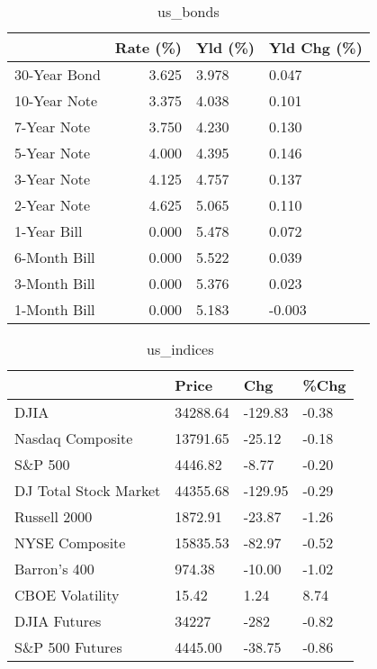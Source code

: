 \documentclass{article}%
\begin{document}
%


\begin{table}[htbp]%
\caption{us\_bonds}%
\centering%
\begin{adjustbox}{width=1\textwidth}%
\begin{tabular}{lrll}
\toprule
             &  Rate (\%) & Yld (\%) & Yld Chg (\%) \\
\midrule
30-Year Bond &     3.625 &   3.978 &       0.047 \\
10-Year Note &     3.375 &   4.038 &       0.101 \\
 7-Year Note &     3.750 &   4.230 &       0.130 \\
 5-Year Note &     4.000 &   4.395 &       0.146 \\
 3-Year Note &     4.125 &   4.757 &       0.137 \\
 2-Year Note &     4.625 &   5.065 &       0.110 \\
 1-Year Bill &     0.000 &   5.478 &       0.072 \\
6-Month Bill &     0.000 &   5.522 &       0.039 \\
3-Month Bill &     0.000 &   5.376 &       0.023 \\
1-Month Bill &     0.000 &   5.183 &      -0.003 \\
\bottomrule
\end{tabular}
%
\end{adjustbox}%
\end{table}

%


\begin{table}[htbp]%
\caption{us\_indices}%
\centering%
\begin{adjustbox}{width=1\textwidth}%
\begin{tabular}{llll}
\toprule
                      &    Price &     Chg &  \%Chg \\
\midrule
                 DJIA & 34288.64 & -129.83 & -0.38 \\
     Nasdaq Composite & 13791.65 &  -25.12 & -0.18 \\
              S\&P 500 &  4446.82 &   -8.77 & -0.20 \\
DJ Total Stock Market & 44355.68 & -129.95 & -0.29 \\
         Russell 2000 &  1872.91 &  -23.87 & -1.26 \\
       NYSE Composite & 15835.53 &  -82.97 & -0.52 \\
         Barron's 400 &   974.38 &  -10.00 & -1.02 \\
      CBOE Volatility &    15.42 &    1.24 &  8.74 \\
         DJIA Futures &    34227 &    -282 & -0.82 \\
      S\&P 500 Futures &  4445.00 &  -38.75 & -0.86 \\
\bottomrule
\end{tabular}
%
\end{adjustbox}%
\end{table}
\end{document}
